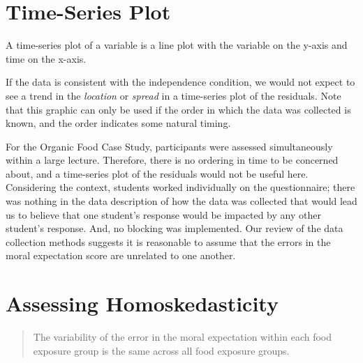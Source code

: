 \documentclass[
  letterpaper,
  DIV=11,
  numbers=noendperiod]{scrreprt}
\theoremstyle{plain}
\theoremstyle{definition}
\theoremstyle{definition}
\theoremstyle{remark}
\begin{document}
\hypertarget{time-series-plot-1}{%
\section{Time-Series Plot}\label{time-series-plot-1}}

A time-series plot of a variable is a line plot with the variable on the
y-axis and time on the x-axis.

\begin{tcolorbox}[enhanced jigsaw, breakable, colback=white, arc=.35mm, coltitle=black, bottomtitle=1mm, titlerule=0mm, colbacktitle=quarto-callout-note-color!10!white, title=\textcolor{quarto-callout-note-color}{\faInfo}\hspace{0.5em}{Graphically Assessing the Independence Condition}, left=2mm, opacityback=0, opacitybacktitle=0.6, colframe=quarto-callout-note-color-frame, toptitle=1mm, toprule=.15mm, rightrule=.15mm, bottomrule=.15mm, leftrule=.75mm]

If the data is consistent with the independence condition, we would not
expect to see a trend in the \emph{location} or \emph{spread} in a
time-series plot of the residuals. Note that this graphic can only be
used if the order in which the data was collected is known, and the
order indicates some natural timing.

\end{tcolorbox}

For the Organic Food Case Study, participants were assessed
simultaneously within a large lecture. Therefore, there is no ordering
in time to be concerned about, and a time-series plot of the residuals
would not be useful here. Considering the context, students worked
individually on the questionnaire; there was nothing in the data
description of how the data was collected that would lead us to believe
that one student's response would be impacted by any other student's
response. And, no blocking was implemented. Our review of the data
collection methods suggests it is reasonable to assume that the errors
in the moral expectation score are unrelated to one another.

\hypertarget{assessing-homoskedasticity-1}{%
\section{Assessing
Homoskedasticity}\label{assessing-homoskedasticity-1}}

\begin{quote}
The variability of the error in the moral expectation within each food
exposure group is the same across all food exposure groups.
\end{quote}
\end{document}
